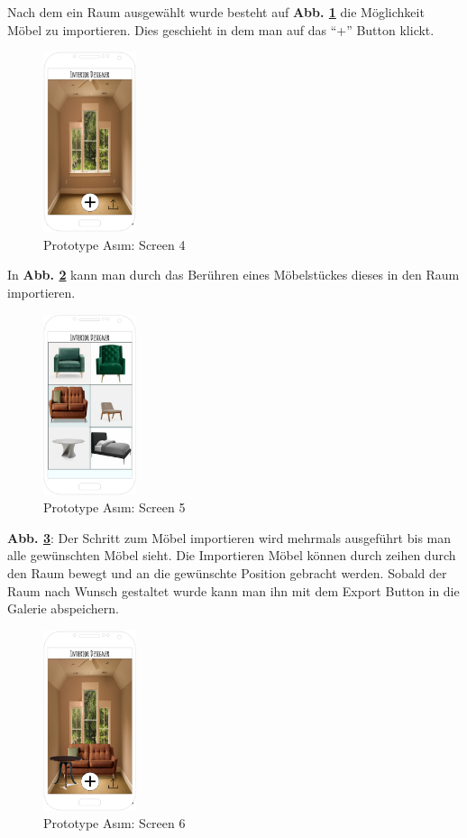 \documentclass[12pt,paper=a4,oneside,hidelinks,headings=small,captions=heading,captions=nooneline]{scrartcl}
\begin{document}
Nach dem ein Raum ausgewählt wurde besteht auf \textbf{Abb. \ref{fig:lofi_asim_4}} die
Möglichkeit Möbel zu importieren. Dies geschieht in
dem man auf das "`+"' Button klickt.

\begin{figure}[htbp]
\centering
\includegraphics[height=200px]{./img/m2_lofi_asim_4.png}
\caption{\label{fig:lofi_asim_4}Prototype Asım: Screen 4}
\end{figure}

In \textbf{Abb. \ref{fig:lofi_asim_5}} kann man durch das Berühren eines
Möbelstückes dieses in den Raum importieren.

\begin{figure}[htbp]
\centering
\includegraphics[height=200px]{./img/m2_lofi_asim_5.png}
\caption{\label{fig:lofi_asim_5}Prototype Asım: Screen 5}
\end{figure}

\textbf{Abb. \ref{fig:lofi_asim_6}}: Der Schritt zum Möbel importieren wird mehrmals ausgeführt bis man
alle gewünschten Möbel sieht.  Die Importieren Möbel können durch
zeihen durch den Raum bewegt und an die gewünschte Position gebracht
werden.  Sobald der Raum nach Wunsch gestaltet wurde kann man ihn mit
dem Export Button in die Galerie abspeichern.

\begin{figure}[htbp]
\centering
\includegraphics[height=200px]{./img/m2_lofi_asim_6.png}
\caption{\label{fig:lofi_asim_6}Prototype Asım: Screen 6}
\end{figure}
\end{document}
